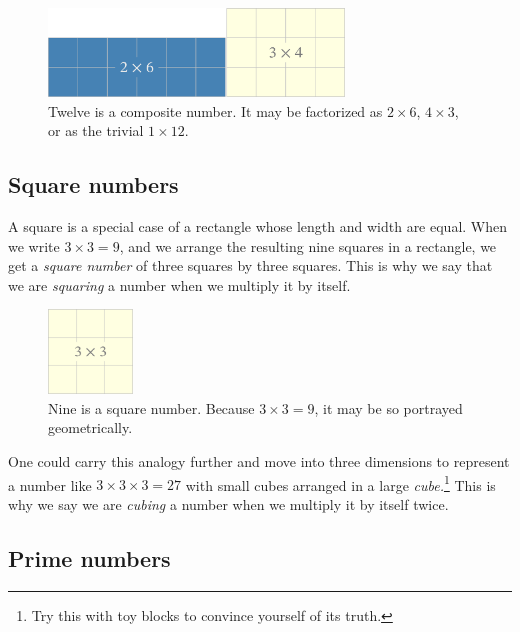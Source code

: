 \documentclass[
  a4paper,
]{article}
\begin{document}
\begin{figure}
\hypertarget{fig:six-by-two}{%
\centering
\includegraphics[width=0.7\textwidth,height=\textheight]{images/six-by-two.png}
\caption{Twelve is a composite number. It may be factorized as
\(2 \times 6\), \(4 \times 3\), or as the trivial
\(1 \times 12\).}\label{fig:six-by-two}
}
\end{figure}

\hypertarget{square-numbers}{%
\subsection{Square numbers}\label{square-numbers}}

A square is a special case of a rectangle whose length and width are
equal. When we write \(3 \times 3 = 9\), and we arrange the resulting
nine squares in a rectangle, we get a \emph{square number} of three
squares by three squares. This is why we say that we are \emph{squaring}
a number when we multiply it by itself.

\begin{figure}
\hypertarget{fig:three-square}{%
\centering
\includegraphics[width=0.2\textwidth,height=\textheight]{images/three-square.png}
\caption{Nine is a square number. Because \(3 \times 3 = 9\), it may be
so portrayed geometrically.}\label{fig:three-square}
}
\end{figure}

One could carry this analogy further and move into three dimensions to
represent a number like \(3 \times 3 \times 3 = 27\) with small cubes
arranged in a large \emph{cube.}\footnote{Try this with toy blocks to
  convince yourself of its truth.} This is why we say we are
\emph{cubing} a number when we multiply it by itself twice.

\hypertarget{prime-numbers}{%
\subsection{Prime numbers}\label{prime-numbers}}
\end{document}
